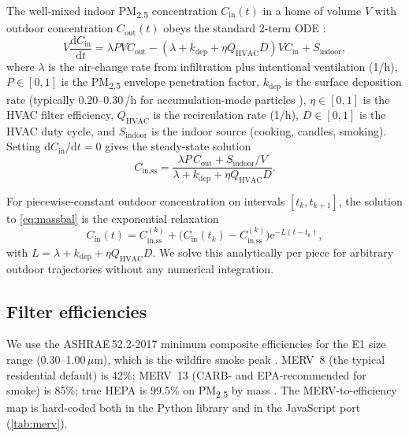 \documentclass[10pt,twocolumn]{article}
\newcommand{\dd}{\mathrm{d}}
\begin{document}
The well-mixed indoor PM\textsubscript{2.5} concentration $C_{\text{in}}(t)$
in a home of volume $V$ with outdoor concentration $C_{\text{out}}(t)$
obeys the standard 2-term ODE \citep{liu2001particle,persily1998ashrae}:
\begin{equation}
V \frac{\dd C_{\text{in}}}{\dd t}
 = \lambda P V C_{\text{out}}
   - (\lambda + k_{\text{dep}} + \eta Q_{\text{HVAC}} D) V C_{\text{in}}
   + S_{\text{indoor}},
\label{eq:massbal}
\end{equation}
where $\lambda$ is the air-change rate from infiltration plus
intentional ventilation (1/h), $P\in[0,1]$ is the PM\textsubscript{2.5}
envelope penetration factor, $k_{\text{dep}}$ is the surface deposition
rate (typically 0.20--0.30\,/h for accumulation-mode particles
\citep{thatcher2002deposition}), $\eta\in[0,1]$ is the HVAC filter
efficiency, $Q_{\text{HVAC}}$ is the recirculation rate (1/h),
$D\in[0,1]$ is the HVAC duty cycle, and $S_{\text{indoor}}$ is the
indoor source (cooking, candles, smoking).  Setting
$\dd C_{\text{in}}/\dd t = 0$ gives the steady-state solution
\begin{equation}
C_{\text{in,ss}} = \frac{\lambda P\, C_{\text{out}} + S_{\text{indoor}}/V}
                      {\lambda + k_{\text{dep}} + \eta Q_{\text{HVAC}} D}.
\label{eq:ss}
\end{equation}

For piecewise-constant outdoor concentration on intervals
$[t_k,t_{k+1}]$, the solution to \cref{eq:massbal} is the exponential
relaxation
\begin{equation}
C_{\text{in}}(t)
 = C_{\text{in,ss}}^{(k)} + \bigl(C_{\text{in}}(t_k) - C_{\text{in,ss}}^{(k)}\bigr)
   \mathrm{e}^{-L (t - t_k)},
\end{equation}
with $L = \lambda + k_{\text{dep}} + \eta Q_{\text{HVAC}} D$.  We solve
this analytically per piece for arbitrary outdoor trajectories without
any numerical integration.

\subsection{Filter efficiencies}

We use the ASHRAE\,52.2-2017 minimum composite efficiencies for the
E1 size range (0.30--1.00\,$\mu$m), which is the wildfire smoke peak
\citep{ashrae522,consumer2025wildfire}.  MERV~8 (the typical
residential default) is 42\%; MERV~13 (CARB- and EPA-recommended for
smoke) is 85\%; true HEPA is 99.5\% on PM\textsubscript{2.5} by mass
\citep{rivers2014hepa}.  The MERV-to-efficiency map is hard-coded
both in the Python library and in the JavaScript port (\cref{tab:merv}).
\end{document}
